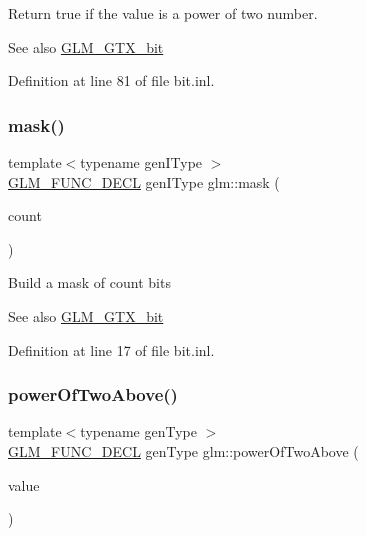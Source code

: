 Return true if the value is a power of two number. \begin{DoxySeeAlso}{See also}
\hyperlink{group__gtx__bit}{G\+L\+M\+\_\+\+G\+T\+X\+\_\+bit} 
\end{DoxySeeAlso}


Definition at line 81 of file bit.\+inl.

\mbox{\label{group__gtx__bit_ga79f1482a09c91f785e7e0ea8aed2b20e}} 
\subsubsection{\texorpdfstring{mask()}{mask()}}
{\footnotesize\ttfamily template$<$typename gen\+I\+Type $>$ \\
\hyperlink{setup_8hpp_ab2d052de21a70539923e9bcbf6e83a51}{G\+L\+M\+\_\+\+F\+U\+N\+C\+\_\+\+D\+E\+CL} gen\+I\+Type glm\+::mask (\begin{DoxyParamCaption}\item[{gen\+I\+Type const \&}]{count }\end{DoxyParamCaption})}

Build a mask of \textquotesingle{}count\textquotesingle{} bits \begin{DoxySeeAlso}{See also}
\hyperlink{group__gtx__bit}{G\+L\+M\+\_\+\+G\+T\+X\+\_\+bit} 
\end{DoxySeeAlso}


Definition at line 17 of file bit.\+inl.

\mbox{\label{group__gtx__bit_gaa49786cf3f8a1f65de6e70b6088a811e}} 
\subsubsection{\texorpdfstring{power\+Of\+Two\+Above()}{powerOfTwoAbove()}}
{\footnotesize\ttfamily template$<$typename gen\+Type $>$ \\
\hyperlink{setup_8hpp_ab2d052de21a70539923e9bcbf6e83a51}{G\+L\+M\+\_\+\+F\+U\+N\+C\+\_\+\+D\+E\+CL} gen\+Type glm\+::power\+Of\+Two\+Above (\begin{DoxyParamCaption}\item[{gen\+Type const \&}]{value }\end{DoxyParamCaption})}

